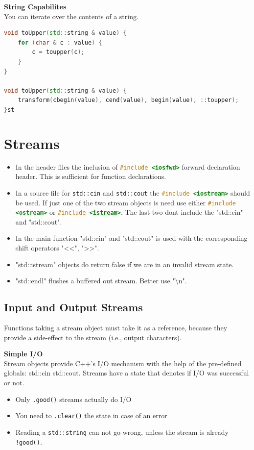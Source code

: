 \textbf{String Capabilites}\\
 You can iterate over the contents of a string.
\begin{lstlisting}[language=C++]
void toUpper(std::string & value) {
	for (char & c : value) {
		c = toupper(c); 
	}
}

void toUpper(std::string & value) {
	transform(cbegin(value), cend(value), begin(value), ::toupper); 
}st	
\end{lstlisting}
\pagebreak


\section{Streams}
\begin{itemize}
  \itemsep -0.5em 
  \item In the header files the inclusion of \lstinline[language=C++]{#include <iosfwd>} forward declaration header. This is sufficient for function declarations.
  \item In a source file for \lstinline|std::cin| and \lstinline|std::cout| the \lstinline[language=C++]{#include <iostream>} should be used. If just one of the two stream objects is need use either \lstinline[language=C++]{#include <ostream>} or \lstinline[language=C++]{#include <istream>}. The last two dont include the "std::cin" and "std::cout".
  \item In the main function "std::cin" and "std::cout" is used with the corresponding shift operators "<<", ">>".
  \item "std::istream" objects do return false if we are in an invalid stream state.
  \item "std::endl" flushes a buffered out stream. Better use "\textbackslash n". 
\end{itemize}

\subsection{Input and Output Streams} 
Functions taking a stream object must take it as a reference, because they provide a side-effect to the stream (i.e., output characters).

\textbf{Simple I/O} \\
Stream objects provide C++'s I/O mechanism with the help of the pre-defined globals: std::cin std::cout. Streams have a state that denotes if I/O was successful or not.
\begin{itemize}
  \itemsep -0.5em 
  \item Only \lstinline|.good()| streams actually do I/O
  \item You need to \lstinline|.clear()| the state in case of an error
  \item Reading a \lstinline|std::string| can not go wrong, unless the stream is already \lstinline|!good()|.
\end{itemize}

